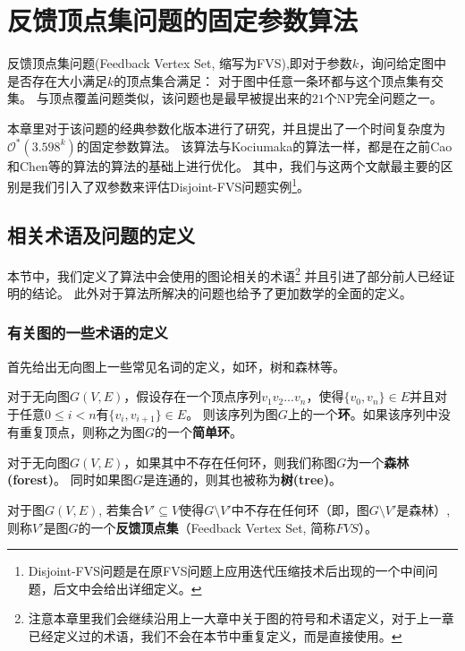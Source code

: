 \chapter{反馈顶点集问题的固定参数算法}
反馈顶点集问题(Feedback Vertex Set, 缩写为FVS),即对于参数$k$，询问给定图中是否存在大小满足$k$的顶点集合满足：
对于图中任意一条环都与这个顶点集有交集。
与顶点覆盖问题类似，该问题也是最早被提出来的$21$个NP完全问题之一。

本章里对于该问题的经典参数化版本进行了研究，并且提出了一个时间复杂度为$\mathcal{O}^*(3.598^k)$的固定参数算法。
该算法与Kociumaka的算法一样，都是在之前Cao和Chen等的算法的算法的基础上进行优化。
其中，我们与这两个文献最主要的区别是我们引入了双参数来评估Disjoint-FVS问题实例\footnote{Disjoint-FVS问题是在原FVS问题上应用迭代压缩技术后出现的一个中间问题，后文中会给出详细定义。}。

\section{相关术语及问题的定义}
本节中，我们定义了算法中会使用的图论相关的术语\footnote{注意本章里我们会继续沿用上一大章中关于图的符号和术语定义，对于上一章已经定义过的术语，我们不会在本节中重复定义，而是直接使用。}
并且引进了部分前人已经证明的结论。
此外对于算法所解决的问题也给予了更加数学的全面的定义。


\subsection{有关图的一些术语的定义}
首先给出无向图上一些常见名词的定义，如环，树和森林等。
\begin{definition}[环]
对于无向图$G(V,E)$，假设存在一个顶点序列$v_1v_2...v_n$，使得$\{v_0, v_n\} \in E$并且对于任意$0 \le i < n$有$\{v_i, v_{i+1}\} \in E$。
则该序列为图$G$上的一个\textbf{环}。如果该序列中没有重复顶点，则称之为图$G$的一个\textbf{简单环}。
\end{definition}

\begin{definition}
对于无向图$G(V,E)$，如果其中不存在任何环，则我们称图$G$为一个\textbf{森林(forest)}。
同时如果图$G$是连通的，则其也被称为\textbf{树(tree)}。
\end{definition}

\begin{definition}[反馈顶点集]
对于图$G(V, E)$, 若集合$V' \subseteq V$使得$G \setminus V'$中不存在任何环（即，图$G \setminus V'$是森林）,
则称$V'$是图$G$的一个\textbf{反馈顶点集}（Feedback Vertex Set, 简称$FVS$）。
\end{definition}

